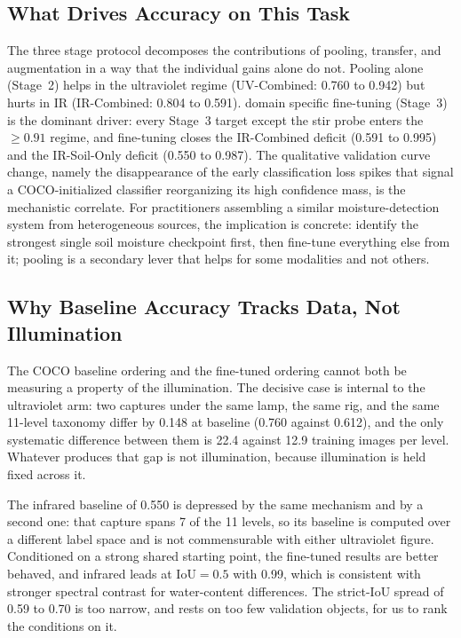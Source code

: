 ﻿\documentclass[journal]{IEEEtran}
\begin{document}
\subsection{What Drives Accuracy on This Task}
The three stage protocol decomposes the contributions of pooling, transfer, and augmentation in a way that the individual gains alone do not. Pooling alone (Stage~2) helps in the ultraviolet regime (UV-Combined: 0.760 to 0.942) but hurts in IR (IR-Combined: 0.804 to 0.591). domain specific fine-tuning (Stage~3) is the dominant driver: every Stage~3 target except the stir probe enters the $\geq 0.91$ regime, and fine-tuning closes the IR-Combined deficit (0.591 to 0.995) and the IR-Soil-Only deficit (0.550 to 0.987). The qualitative validation curve change, namely the disappearance of the early classification loss spikes that signal a COCO-initialized classifier reorganizing its high confidence mass, is the mechanistic correlate. For practitioners assembling a similar moisture-detection system from heterogeneous sources, the implication is concrete: identify the strongest single soil moisture checkpoint first, then fine-tune everything else from it; pooling is a secondary lever that helps for some modalities and not others.

\subsection{Why Baseline Accuracy Tracks Data, Not Illumination}
The COCO baseline ordering and the fine-tuned ordering cannot both be measuring a property of the illumination. The decisive case is internal to the ultraviolet arm: two captures under the same lamp, the same rig, and the same 11-level taxonomy differ by 0.148 at baseline (0.760 against 0.612), and the only systematic difference between them is 22.4 against 12.9 training images per level. Whatever produces that gap is not illumination, because illumination is held fixed across it.

The infrared baseline of 0.550 is depressed by the same mechanism and by a second one: that capture spans 7 of the 11 levels, so its baseline is computed over a different label space and is not commensurable with either ultraviolet figure. Conditioned on a strong shared starting point, the fine-tuned results are better behaved, and infrared leads at $\text{IoU}=0.5$ with 0.99, which is consistent with stronger spectral contrast for water-content differences. The strict-IoU spread of 0.59 to 0.70 is too narrow, and rests on too few validation objects, for us to rank the conditions on it.
\end{document}
